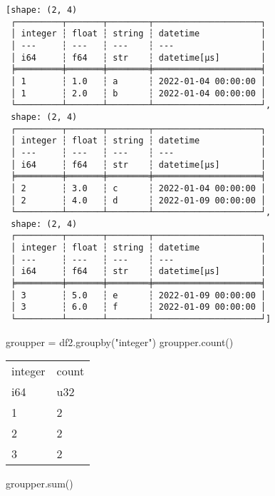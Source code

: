 \documentclass[
  letterpaper,
  DIV=11,
  numbers=noendperiod]{scrartcl}
\newenvironment{Shaded}{\begin{snugshade}}{\end{snugshade}}
\newcommand{\BuiltInTok}[1]{\textcolor[rgb]{0.00,0.23,0.31}{#1}}
\newcommand{\NormalTok}[1]{\textcolor[rgb]{0.00,0.23,0.31}{#1}}
\newcommand{\OperatorTok}[1]{\textcolor[rgb]{0.37,0.37,0.37}{#1}}
\newcommand{\StringTok}[1]{\textcolor[rgb]{0.13,0.47,0.30}{#1}}
\begin{document}
\begin{verbatim}
[shape: (2, 4)
 ┌─────────┬───────┬────────┬─────────────────────┐
 │ integer ┆ float ┆ string ┆ datetime            │
 │ ---     ┆ ---   ┆ ---    ┆ ---                 │
 │ i64     ┆ f64   ┆ str    ┆ datetime[μs]        │
 ╞═════════╪═══════╪════════╪═════════════════════╡
 │ 1       ┆ 1.0   ┆ a      ┆ 2022-01-04 00:00:00 │
 │ 1       ┆ 2.0   ┆ b      ┆ 2022-01-04 00:00:00 │
 └─────────┴───────┴────────┴─────────────────────┘,
 shape: (2, 4)
 ┌─────────┬───────┬────────┬─────────────────────┐
 │ integer ┆ float ┆ string ┆ datetime            │
 │ ---     ┆ ---   ┆ ---    ┆ ---                 │
 │ i64     ┆ f64   ┆ str    ┆ datetime[μs]        │
 ╞═════════╪═══════╪════════╪═════════════════════╡
 │ 2       ┆ 3.0   ┆ c      ┆ 2022-01-04 00:00:00 │
 │ 2       ┆ 4.0   ┆ d      ┆ 2022-01-09 00:00:00 │
 └─────────┴───────┴────────┴─────────────────────┘,
 shape: (2, 4)
 ┌─────────┬───────┬────────┬─────────────────────┐
 │ integer ┆ float ┆ string ┆ datetime            │
 │ ---     ┆ ---   ┆ ---    ┆ ---                 │
 │ i64     ┆ f64   ┆ str    ┆ datetime[μs]        │
 ╞═════════╪═══════╪════════╪═════════════════════╡
 │ 3       ┆ 5.0   ┆ e      ┆ 2022-01-09 00:00:00 │
 │ 3       ┆ 6.0   ┆ f      ┆ 2022-01-09 00:00:00 │
 └─────────┴───────┴────────┴─────────────────────┘]
\end{verbatim}

\begin{Shaded}
\begin{Highlighting}[]
\NormalTok{groupper }\OperatorTok{=}\NormalTok{ df2.groupby(}\StringTok{"integer"}\NormalTok{)}
\NormalTok{groupper.count()}
\end{Highlighting}
\end{Shaded}

\begin{longtable}[]{@{}ll@{}}
\toprule()
integer & count \\
i64 & u32 \\
\midrule()
\endhead
1 & 2 \\
2 & 2 \\
3 & 2 \\
\bottomrule()
\end{longtable}

\begin{Shaded}
\begin{Highlighting}[]
\NormalTok{groupper.}\BuiltInTok{sum}\NormalTok{()}
\end{Highlighting}
\end{Shaded}
\end{document}
